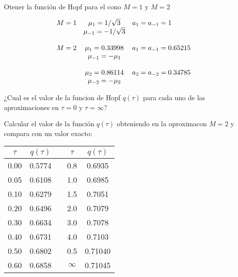 \documentclass[12pt,spanish,a4paper]{practice}
\begin{document}
    \begin{problem}\label{prob:7}
        \begin{ppart}\label{prob:7:a}
            Otener la función de Hopf para el cono $M=1$ y $M=2$

            \begin{equation*}
                \begin{array}{l c l c l}
                    M=1 & \mu_{1}=1/\sqrt{3}  & a_{1} = a_{-1} = 1\\
                      & \mu_{-1}= -1/\sqrt{3}  &  \\
                       &         &             &   \\
                    M=2 & \mu_{1}=0.33998  & a_{1} = a_{-1} =0.65215\\
                      & \mu_{-1}= -\mu_{1}  &  \\
                    &         &             &   \\
                      & \mu_{2}=0.86114  & a_{2} = a_{-2} =0.34785\\
                      & \mu_{-2}= -\mu_{2}  &  
                \end{array}
            \end{equation*}
        \end{ppart}
        

        \begin{ppart}\label{prob:7:b}
            ¿Cual es el valor de la funcion de Hopf $q(\tau)$ para cada uno de las aproximaciones en $ \tau = 0 $ y $\tau = \infty$?    
        \end{ppart}

        \begin{ppart}\label{prob:7:c}
            Calcular el valor de la función $q(\tau)$ obteniendo en la oproximacon $M=2$ y compara con un valor exacto:

                \begin{table}[h!]
                \centering
                    \begin{tabular}{c |c l c|c} 
                         
                         $\tau$ & $q(\tau)$ &  &$\tau$ & $q(\tau)$ \\ [0.5ex] 
                         \hline
                         0.00 & 0.5774 &  &0.8 & 0.6935 \\ 
                         0.05 & 0.6108 &  & 1.0 & 0.6985\\
                         0.10 & 0.6279 &  & 1.5 & 0.7051\\
                         0.20 & 0.6496 &  & 2.0 & 0.7079\\
                         0.30 & 0.6634 &  & 3.0 & 0.7078\\
                         0.40 & 0.6731 &  & 4.0 & 0.7103\\
                         0.50 & 0.6802 &  & 0.5 & 0.71040\\
                         0.60 & 0.6858 &  & $\infty$ & 0.71045\\ [1ex] 
                         

\end{tabular}
\end{table}
\end{ppart}
\end{problem}
\end{document}
